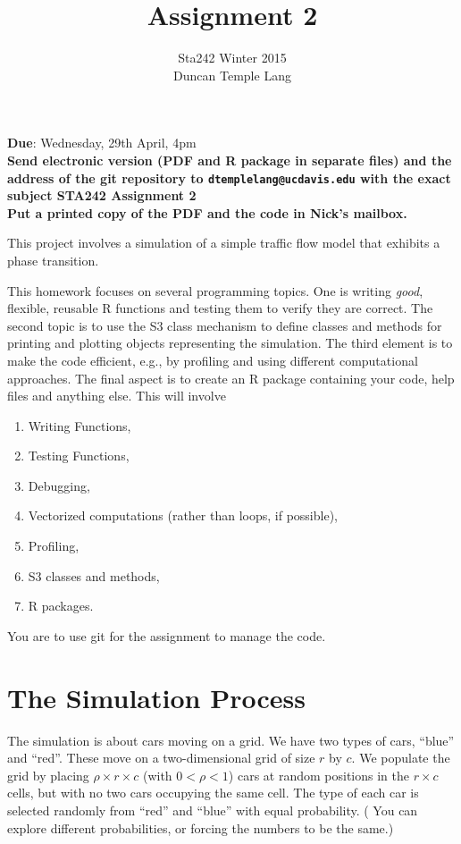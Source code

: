 \documentclass{article}
\title{Assignment 2}
\author{Sta242 Winter 2015 \\
Duncan Temple Lang
}
\begin{document}
\maketitle
\begin{center}
\textbf{Due}: Wednesday, 29th April, 4pm \\
\textbf{Send electronic version (PDF and R package in separate files) and the address of the git
  repository to \texttt{dtemplelang@ucdavis.edu} with the \textbf{exact} subject \textbf{STA242 Assignment 2}}\\
\textbf{Put a printed copy of the PDF and the code in Nick's mailbox.}
\end{center}

This project involves a simulation of a 
simple traffic flow model that exhibits a phase transition.

This homework focuses on several programming topics.  One is writing
\textit{good}, flexible, reusable R functions and testing them to
verify they are correct.  The second topic is to use the S3 class
mechanism to define classes and methods for printing and plotting
objects representing the simulation.  
The third element is to make the code efficient, e.g., by profiling and using different
computational approaches.
The final aspect is to create an
R package containing your code, help files and anything else.
This will involve
\begin{enumerate}
\item Writing Functions,
\item Testing Functions,
\item Debugging,
\item Vectorized computations (rather than loops, if possible),
\item Profiling,
\item S3 classes and methods,
\item R packages.
\end{enumerate}


You are to use git for the assignment to manage the code.


\section{The Simulation Process}

The simulation is about cars moving on a grid.  We have two types of
cars, ``blue'' and ``red''.  These move on a two-dimensional grid of
size $r$ by $c$.  We populate the grid by placing $\rho \times r
\times c$ (with $0 < \rho < 1$) cars at random positions in the $r
\times c$ cells, but with no two cars occupying the same cell.  The
type of each car is selected randomly from ``red'' and ``blue'' with
equal probability.  ( You can explore different probabilities, or
forcing the numbers to be the same.)
\end{document}
